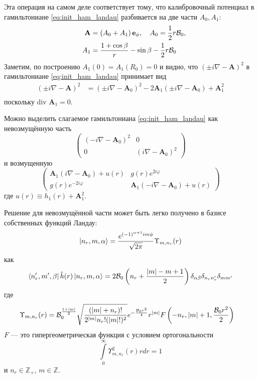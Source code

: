 \documentclass[a4paper,article,14pt]{extarticle}
\begin{document}
Эта операция на самом деле соответствует тому, что калибровочный потенциал в гамильтониане \eqref{eq:init_ham_landau} разбивается на две части $A_0,A_1$:
\begin{equation}
\begin{aligned}
\mathbf{A}  & = \left(A_0 + A_1  \right) \mathbf{e}_\phi, \quad A_0 =   \frac 1 2 r {\cal B}_{0} ,    \\
\quad A_1 & = \frac{1+  \cos\beta } { r } - \sin \beta - \frac 1 2 r {\cal B}_{0}     \\
\end{aligned}
\label{eq:devide_2_hamilte}
\end{equation}
Заметим, по построению $A_{1}(0) = A_{1}(R_{0}) = 0 $ и видно, что $(\pm i \nabla - \mathbf{A} ) ^ 2$  в гамильтониане \eqref{eq:init_ham_landau} принимает вид
\begin{equation}
\begin{aligned}
(\pm i \nabla - \mathbf{A} ) ^ 2 & = (\pm i \nabla - \mathbf{A}_0 ) ^ 2 - 
2 \mathbf{A}_1  (\pm i \nabla - \mathbf{A}_0 )+ \mathbf{A}_1^2   \\
\end{aligned}
\end{equation}
поскольку $ \mbox{div } \mathbf{A}_1=0$.

Можно выделить слагаемое гамильтониана \eqref{eq:init_ham_landau} как невозмущённую часть
$$
\begin{pmatrix} ( -i \nabla - \mathbf{A}_0 ) ^ 2 & 0 \\ 0 & ( i \nabla - \mathbf{A}_0 ) ^ 2 \end{pmatrix}
$$
и возмущенную
$$
\begin{pmatrix} \mathbf{A}_1  (i \nabla - \mathbf{A}_0 ) + u(r) & g (r) e^{2 i  \varphi} \\ g (r) e^{-2 i  \varphi} & \mathbf{A}_1  (-i \nabla - \mathbf{A}_0 ) + u(r) \end{pmatrix}
$$ 
где $u(r) \equiv  h_1(r) + \mathbf{A}_1^2$. 

Решение для невозмущённой части может быть легко получено в базисе собственных функций Ландау\cite{landau}:
\begin{equation}
\label{eq:basis_func_landau}
\ket{n_r, m, \alpha} = \frac{e^{(-1)^{\alpha+1}  i m \phi}} {\sqrt{2 \pi}} \Upsilon_{m,n_r} (r)
\end{equation}
как
$$
\bra{n_r', m', \beta} \hat h (r)  \ket{n_r, m, \alpha} = 2 {\cal B}_{0} \left( n_r + \frac{|m| - m + 1}{2} \right) \delta_{\alpha \beta} \delta_{n_r n'_r} \delta_{m m'} 
$$
\noindent где  
\begin{equation}
\begin{aligned}
\Upsilon_{m, n_r} (r) & = {\cal B}_{0}^{\frac{1+|m|}{2}} \sqrt{\frac{(|m| + n_r)!}{2^{|m|}n_r!(|m|!)^2}} e^{-\frac{{\cal B}_{0} r^2}{4}} r^{|m|} F\left(-n_r,|m| + 1,\frac{{\cal B}_{0} r^2 }{2} \right) 
\end{aligned}
\end{equation}
\noindent $F$  --- это гипергеометрическая функция с условием ортогональности 
$$ \int\limits_0^\infty \Upsilon_{m, n_r}^2 (r) r dr = 1$$
и $n_r \in \mathbb{Z}_+$, $m \in \mathbb{Z}$.
\end{document}
